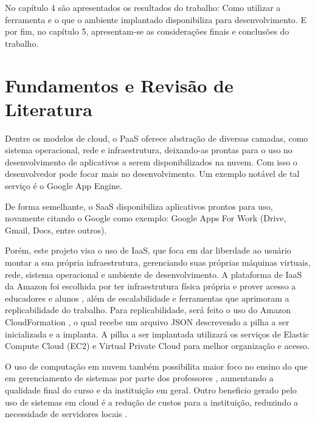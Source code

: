 \documentclass[tg]{mdtufsm}
\begin{document}
No capítulo 4 são apresentados os resultados do trabalho: Como utilizar a ferramenta e o que o ambiente implantado disponibiliza para desenvolvimento. E por fim, no capítulo 5, apresentam-se as considerações finais e conclusões do trabalho.

\chapter{Fundamentos e Revisão de Literatura}


Dentre os modelos de cloud, o PaaS oferece abstração de diversas camadas, como sistema operacional, rede e infraestrutura, deixando-as prontas para o uso no desenvolvimento de aplicativos a serem disponibilizados na nuvem. Com isso o desenvolvedor pode focar mais no desenvolvimento. Um exemplo notável de tal serviço é o Google App Engine.

De forma semelhante, o SaaS disponibiliza aplicativos prontos para uso, novamente citando o Google como exemplo: Google Apps For Work (Drive, Gmail, Docs, entre outros).

Porém, este projeto visa o uso de IaaS, que foca em dar liberdade ao usuário montar a sua própria infraestrutura, gerenciando suas próprias máquinas virtuais, rede, sistema operacional e ambiente de desenvolvimento. A plataforma de IaaS da Amazon foi escolhida por ter infraestrutura física própria e prover acesso a educadores e alunos \cite{awsedu}, além de escalabilidade e ferramentas que aprimoram a replicabilidade do trabalho. Para replicabilidade, será feito o uso do Amazon CloudFormation \cite{awscf}, o qual recebe um arquivo JSON descrevendo a pilha a ser inicializada e a implanta. A pilha a ser implantada utilizará os serviços de Elastic Compute Cloud (EC2)\cite{awsec2} e Virtual Private Cloud\cite{vpc} para melhor organização e acesso.

O uso de computação em nuvem também possibilita maior foco no ensino do que em gerenciamento de sistemas por parte dos professores \cite{cloudedu}, aumentando a qualidade final do curso e da instituição em geral. Outro beneficio gerado pelo uso de sistemas em cloud é a redução de custos para a instituição, reduzindo a necessidade de servidores locais \cite{toutcloud}.
\end{document}
